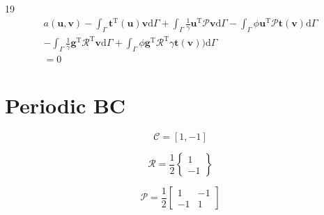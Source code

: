 \documentclass[a4paper,12pt]{article}
\begin{document}
19
\begin{equation}
\begin{split}
a(\mathbf{u},\mathbf{v})
-
\int_\Gamma
\mathbf{t}^\textrm{T}(\mathbf{u})\mathbf{v}
\textrm{d}\Gamma
+
\int_\Gamma
\frac{1}{\gamma}
\mathbf{u}^\textrm{T}\mathcal{P}\mathbf{v}
\textrm{d}\Gamma
-
\int_\Gamma
\phi\mathbf{u}^\textrm{T}\mathcal{P}\mathbf{t}(\mathbf{v})
\textrm{d}\Gamma
\\-
\int_\Gamma
\frac{1}{\gamma}
\mathbf{g}^\textrm{T}\mathcal{R}^\textrm{T}
\mathbf{v}
\textrm{d}\Gamma
+
\int_\Gamma
\phi\mathbf{g}^\textrm{T}\mathcal{R}^\textrm{T}\gamma\mathbf{t}(\mathbf{v}))
\textrm{d}\Gamma
\\=
0
\end{split}
\end{equation}

\section{Periodic BC}

\begin{equation}
\mathcal{C} = [1,-1]
\end{equation}

\begin{equation}
\mathcal{R} = \frac{1}{2}
\left\{
\begin{array}{c}
1\\
-1
\end{array}
\right\}
\end{equation}

\begin{equation}
\mathcal{P} = \frac{1}{2}
\left[
\begin{array}{cc}
1 & -1\\
-1 & 1
\end{array}
\right]
\end{equation}
\end{document}
